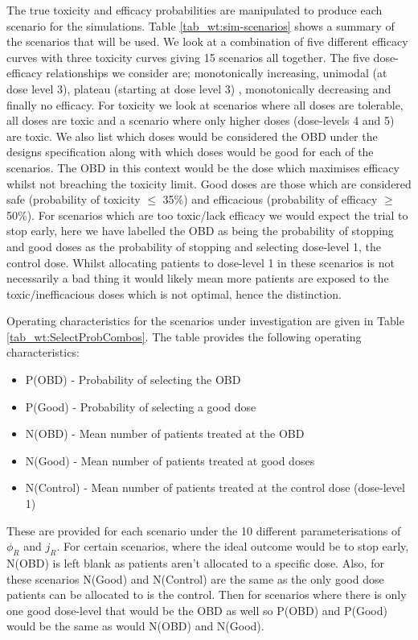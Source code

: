 The true toxicity and efficacy probabilities are manipulated to produce each scenario for the simulations. Table \ref{tab_wt:sim-scenarios} shows a summary of the scenarios that will be used. We look at a combination of five different efficacy curves with three toxicity curves giving 15 scenarios all together. The five dose-efficacy relationships we consider are; monotonically increasing, unimodal (at dose level 3), plateau (starting at dose level 3) , monotonically decreasing and finally no efficacy. For toxicity we look at scenarios where all doses are tolerable, all doses are toxic and a scenario where only higher doses (dose-levels 4 and 5) are toxic. We also list which doses would be considered the OBD under the designs specification along with which doses would be good for each of the scenarios. The OBD in this context would be the dose which maximises efficacy whilst not breaching the toxicity limit. Good doses are those which are considered safe (probability of toxicity $\leq$ 35\%) and efficacious (probability of efficacy $\geq$ 50\%). For scenarios which are too toxic/lack efficacy we would expect the trial to stop early, here we have labelled the OBD as being the probability of stopping and good doses as the probability of stopping and selecting dose-level 1, the control dose. Whilst allocating patients to dose-level 1 in these scenarios is not necessarily a bad thing it would likely mean more patients are exposed to the toxic/inefficacious doses which is not optimal, hence the distinction.  

Operating characteristics for the scenarios under investigation are given in Table \ref{tab_wt:SelectProbCombos}. The table provides the following operating characteristics: 

\begin{itemize}
	\item P(OBD) - Probability of selecting the OBD
	\item P(Good) - Probability of selecting a good dose
	\item N(OBD) - Mean number of patients treated at the OBD
	\item N(Good) - Mean number of patients treated at good doses
	\item N(Control) - Mean number of patients treated at the control dose (dose-level 1)
\end{itemize}

These are provided for each scenario under the 10 different parameterisations of $\phi_R$ and $j_R$. For certain scenarios, where the ideal outcome would be to stop early, N(OBD) is left blank as patients aren't allocated to a specific dose. Also, for these scenarios N(Good) and N(Control) are the same as the only good dose patients can be allocated to is the control. Then for scenarios where there is only one good dose-level that would be the OBD as well so P(OBD) and P(Good) would be the same as would N(OBD) and N(Good). 


